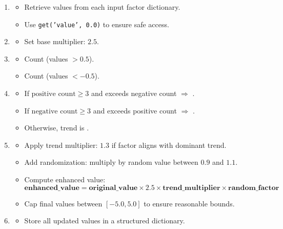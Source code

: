 \documentclass[3p,times,procedia]{elsarticle}
\begin{document}
\begin{enumerate}
    \item {}
    \begin{itemize}
        \item Retrieve values from each input factor dictionary.
        \item Use \texttt{get('value', 0.0)} to ensure safe access.
    \end{itemize}

    \item {}
    \begin{itemize}
        \item Set base multiplier: $2.5$.
    \end{itemize}

    \item {}
    \begin{itemize}
        \item Count  (values $> 0.5$).
        \item Count  (values $< -0.5$).
    \end{itemize}

    \item {}
    \begin{itemize}
        \item If $\text{positive count} \geq 3$ and exceeds negative count $\Rightarrow$ .
        \item If $\text{negative count} \geq 3$ and exceeds positive count $\Rightarrow$ .
        \item Otherwise, trend is .
    \end{itemize}

    \item {}
    \begin{itemize}
        \item Apply trend multiplier: $1.3$ if factor aligns with dominant trend.
        \item Add randomization: multiply by random value between $0.9$ and $1.1$.
        \item Compute enhanced value: 
        \begin{equation}
\bm{\textbf{enhanced\_value} = \textbf{original\_value} \times 2.5 \times \textbf{trend\_multiplier} \times \textbf{random\_factor}}
\end{equation}

        \item Cap final values between $[-5.0, 5.0]$ to ensure reasonable bounds.
    \end{itemize}

    \item {}
    \begin{itemize}
        \item Store all updated values in a structured dictionary.
    \end{itemize}

\end{enumerate}
\end{document}
